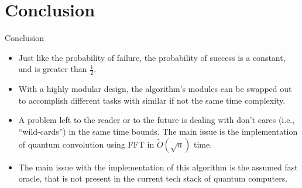 \documentclass{beamer}
\begin{document}
\section{Conclusion}
\begin{frame}{Conclusion}
  \begin{itemize}
    \item Just like the probability of failure, the probability of success is a constant, and is greater than $\frac12$.
    \item With a highly modular design, the algorithm's modules can be swapped out to accomplish different tasks with similar if not the same time complexity.
    \item A problem left to the reader or to the future is dealing with don't cares (i.e., ``wild-cards'') in the same time bounds. The main issue is the implementation of quantum convolution using FFT in $\widetilde{O}(\sqrt{n})$ time.
    \item The main issue with the implementation of this algorithm is the assumed fast oracle, that is not present in the current tech stack of quantum computers.
  \end{itemize}
\end{frame}
\end{document}
